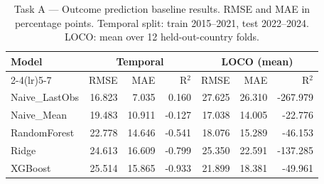 \begin{table}[htbp]
\centering
\caption{Task A — Outcome prediction baseline results. RMSE and MAE in percentage points. Temporal split: train 2015--2021, test 2022--2024. LOCO: mean over 12 held-out-country folds.}
\label{tab:taskA}
\begin{tabular}{lrrrrrr}
\toprule
Model & \multicolumn{3}{c}{Temporal} & \multicolumn{3}{c}{LOCO (mean)} \\
\cmidrule(lr){2-4}\cmidrule(lr){5-7}
& RMSE & MAE & R$^2$ & RMSE & MAE & R$^2$ \\
\midrule
Naive_LastObs & 16.823 & 7.035 & 0.160 & 27.625 & 26.310 & -267.979 \\
Naive_Mean & 19.483 & 10.911 & -0.127 & 17.038 & 14.005 & -22.776 \\
RandomForest & 22.778 & 14.646 & -0.541 & 18.076 & 15.289 & -46.153 \\
Ridge & 24.613 & 16.609 & -0.799 & 25.350 & 22.591 & -137.285 \\
XGBoost & 25.514 & 15.865 & -0.933 & 21.899 & 18.381 & -49.961 \\
\bottomrule
\end{tabular}
\end{table}